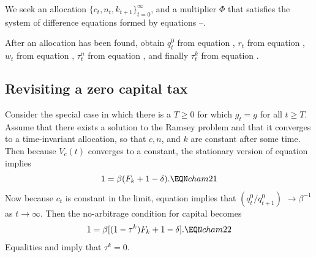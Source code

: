 We seek an allocation $\{c_t, n_t, k_{t+1}\}_{t=0}^\infty$, and a
multiplier $\Phi$ that satisfies the system of difference
equations formed by equations
--.

\medskip
{}
After an allocation has been found, obtain $q^0_t$
from equation  ,  $r_t$ from equation ,  $w_t$ from
equation ,   $\tau^n_t$ from equation , and finally
$\tau^k_t$ from equation .
%
\subsection{Revisiting a zero capital tax}
  Consider the special case in which there
is a $T \geq 0$ for which $g_t = g$  for all $t \geq T$.
Assume that there exists a solution to the Ramsey problem and
that it converges to a  time-invariant allocation, so
that $c, n$, and $k$ are constant after some time.
Then because $V_c(t)$ converges to a constant, the
stationary version of equation 
implies
$$ 1 = \beta( F_k + 1 -\delta ).   \EQN cham21 $$
Now because $c_t$ is  constant in the limit, equation
   implies that
$\left(q^0_{t} / q^0_{t+1}\right)$ $\rightarrow \beta^{-1}$ as $t \rightarrow
\infty$.  Then the  no-arbitrage condition for capital  becomes
$$ 1 = \beta[(1-\tau^k) F_k +1-\delta]. \EQN cham22 $$
Equalities  and  imply
that $\tau^k = 0$.

